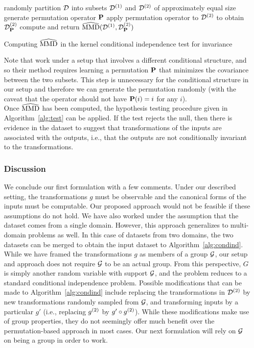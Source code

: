 \begin{algorithm}[H]
\SetAlgoLined
{}
\BlankLine
randomly partition $\mathcal{D}$ into subsets $\mathcal{D}^{(1)}$ and $\mathcal{D}^{(2)}$ of approximately equal size\;
generate permutation operator $\mathbf{P}$\;
apply permutation operator to $\mathcal{D}^{(2)}$ to obtain $\mathcal{D}_{\mathbf{P}}^{(2)}$\;
compute and return $\widehat{\mathrm{MMD}}(\mathcal{D}^{(1)},\mathcal{D}_{\mathbf{P}}^{(2)})$\;
\caption{Computing $\widehat{\mathrm{MMD}}$ in the kernel conditional independence test for invariance}
\label{alg:condind}
\end{algorithm}
\vspace{1em}

Note that \textcite{Doran:2014} work under a setup that involves a different conditional structure, and so their method requires learning a permutation $\mathbf{P}$ that minimizes the covariance between the two subsets. This step is unnecessary for the conditional structure in our setup and therefore we can generate the permutation randomly (with the caveat that the operator should not have $\mathbf{P}(i)=i$ for any $i$).
\\

Once $\widehat{\mathrm{MMD}}$ has been computed, the hypothesis testing procedure given in Algorithm~\ref{alg:test} can be applied. If the test rejects the null, then there is evidence in the dataset to suggest that transformations of the inputs are associated with the outputs, i.e., that the outputs are not conditionally invariant to the transformations.

\subsubsection{Discussion}

We conclude our first formulation with a few comments. Under our described setting, the transformations $g$ must be observable and the canonical forms of the inputs must be computable. Our proposed approach would not be feasible if these assumptions do not hold. We have also worked under the assumption that the dataset comes from a single domain. However, this approach generalizes to multi-domain problems as well. In this case of datasets from two domains, the two datasets can be merged to obtain the input dataset to Algorithm~\ref{alg:condind}.
\\

While we have framed the transformations $g$ as members of a group $\mathcal{G}$, our setup and approach does not require $\mathcal{G}$ to be an actual group. From this perspective, $G$ is simply another random variable with support $\mathcal{G}$, and the problem reduces to a standard conditional independence problem. Possible modifications that can be made to Algorithm~\ref{alg:condind} include replacing the transformations in $\mathcal{D}^{(2)}$ by new transformations randomly sampled from $\mathcal{G}$, and transforming inputs by a particular $g'$ (i.e., replacing $g^{(2)}$ by $g'\circ g^{(2)}$). While these modifications make use of group properties, they do not seemingly offer much benefit over the permutation-based approach in most cases. Our next formulation will rely on $\mathcal{G}$ on being a group in order to work.


